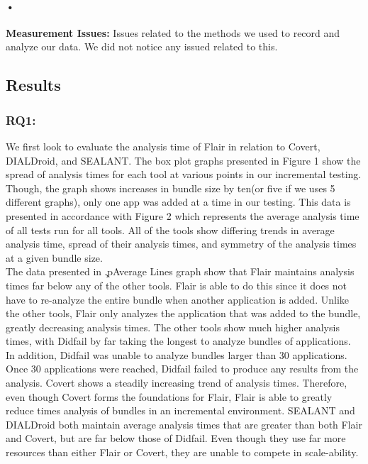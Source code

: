 \documentclass[twocolumn]{article}
\begin{document}
\paragraph{•}
	\textbf{Measurement Issues:} Issues related to the methods we used to record and analyze our data. We did not notice any issued related to this.
	


\subsection{Results}
	
	\subsubsection{RQ1:}
		We first look to evaluate the analysis time of Flair in relation to Covert, DIALDroid, and SEALANT. The box plot graphs presented in Figure 1 show the spread of analysis times for each tool at various points in our incremental testing. Though, the graph shows increases in bundle size by ten(or five if we uses 5 different graphs), only one app was added at a time in our testing. This data is presented in accordance with Figure 2 which represents the average analysis time of all tests run for all tools. All of the tools show differing trends in average analysis time, spread of their analysis times, and symmetry of the analysis times at a given bundle size. \\
		The data presented in \c.p{Average Lines graph} show that Flair maintains analysis times far below any of the other tools. Flair is able to do this since it does not have to re-analyze the entire bundle when another application is added. Unlike the other tools, Flair only analyzes the application that was added to the bundle, greatly decreasing analysis times. The other tools show much higher analysis times, with Didfail by far taking the longest to analyze bundles of applications. In addition, Didfail was unable to analyze bundles larger than 30 applications. Once 30 applications were reached, Didfail failed to produce any results from the analysis. Covert shows a steadily increasing trend of analysis times. Therefore, even though Covert forms the foundations for Flair, Flair is able to greatly reduce times analysis of bundles in an incremental environment. SEALANT and DIALDroid both maintain average analysis times that are greater than both Flair and Covert, but are far below those of Didfail. Even though they use far more resources than either Flair or Covert, they are unable to compete in scale-ability.\\
\end{document}

